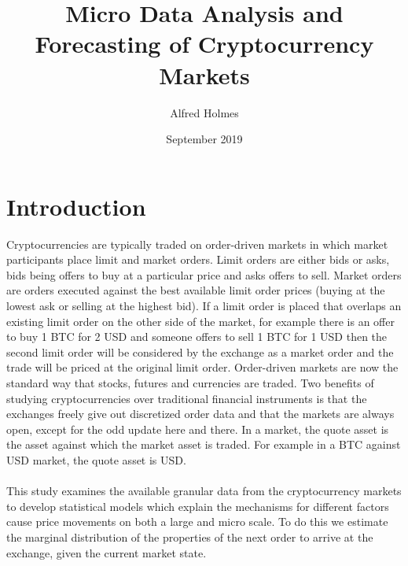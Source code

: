 \documentclass[a4paper,10pt]{article}
\title{Micro Data Analysis and Forecasting of Cryptocurrency Markets}
\author{Alfred Holmes}
\date{September 2019}
\begin{document}
   \maketitle
\section{Introduction}
Cryptocurrencies are typically traded on order-driven markets in which market participants place limit and market orders. Limit orders are either bids or asks, bids being offers to buy at a particular price and asks offers to sell. Market orders are orders executed against the best available limit order prices (buying at the lowest ask or selling at the highest bid). If a limit order is placed that overlaps an existing limit order on the other side of the market, for example there is an offer to buy 1 BTC for 2 USD and someone offers to sell 1 BTC for 1 USD then the second limit order will be considered by the exchange as a market order and the trade will be priced at the original limit order. Order-driven markets are now the standard way that stocks, futures and currencies are traded. Two benefits of studying cryptocurrencies over traditional financial instruments is that the exchanges freely give out discretized order data and that the markets are always open, except for the odd update here and there. In a market, the quote asset is the asset against which the market asset is traded. For example in a BTC against USD market, the quote asset is USD.\\ \\
This study examines the available granular data from the cryptocurrency markets to develop statistical models which explain the mechanisms for different factors cause price movements on both a large and micro scale. To do this we estimate the marginal distribution of the properties of the next order to arrive at the exchange, given the current market state. \\ \\
\end{document}
